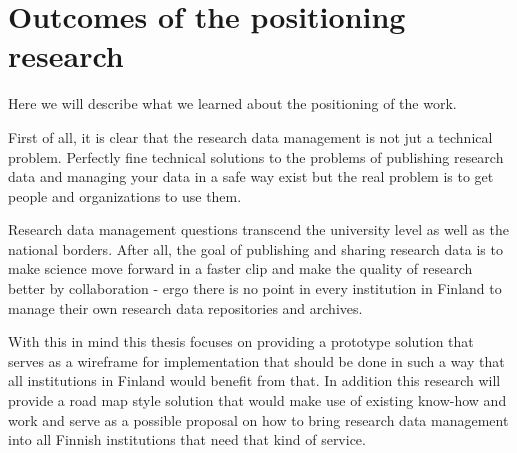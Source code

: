 \section{Outcomes of the positioning research}
\label{sec:positioning_outcomes}

Here we will describe what we learned about the positioning of the work.

First of all, it is clear that the research data management is not jut a
technical problem. Perfectly fine technical solutions to the problems of
publishing research data and managing your data in a safe way exist but the
real problem is to get people and organizations to use them.

Research data management questions transcend the university level as well
as the national borders. After all, the goal of publishing and sharing
research data is to make science move forward in a faster clip and make the
quality of research better by collaboration - ergo there is no point in every
institution in Finland to manage their own research data repositories and
archives.

With this in mind this thesis focuses on providing a prototype solution that
serves as a wireframe for implementation that should be done in such a way that
all institutions in Finland would benefit from that. In addition this research
will provide a road map style solution that would make use of existing know-how
and work and serve as a possible proposal on how to bring research data
management into all Finnish institutions that need that kind of service.
